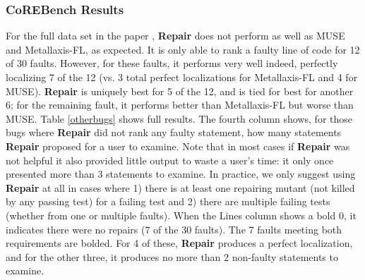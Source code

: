 \subsubsection{CoREBench Results} For the full data set in the paper \cite{Papadakis}, {\bf Repair} does not perform as well as MUSE and Metallaxis-FL, as expected.   It is only able to  rank a faulty line of code for 12 of 30 faults.  However, for these faults, it performs very well indeed, perfectly localizing 7 of the 12 (vs. 3 total perfect localizations for Metallaxis-FL and 4 for MUSE).  {\bf Repair} is uniquely best for 5 of the 12, and is tied for best for another 6; for the remaining fault, it performs better than Metallaxis-FL but worse than MUSE.  Table \ref{otherbugs} shows full results.  The fourth column shows, for those bugs where {\bf Repair} did not rank any faulty statement, how many statements {\bf Repair} proposed for a user to examine.  Note that in most cases if {\bf Repair} was not helpful it also provided little output to waste a user's time: it only once presented more than 3 statements to examine.   In practice, we only suggest using {\bf Repair} at all in cases where 1) there is at least one repairing mutant (not killed by any passing test) for a failing test and 2) there are multiple failing tests (whether from one or multiple faults).  When the Lines column shows a bold 0, it indicates there were no repairs (7 of the 30 faults).  The 7 faults meeting both requirements are bolded.  For 4 of these, {\bf Repair} produces a perfect localization, and for the other three, it produces no more than 2 non-faulty statements to examine.

